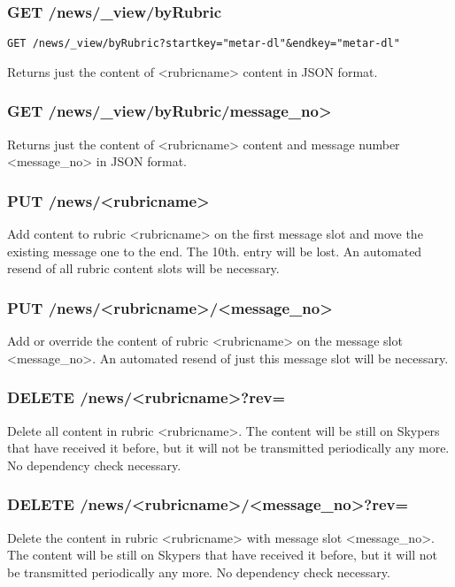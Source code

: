 \subsubsection{GET /news/\_view/byRubric}
\begin{verbatim}
GET /news/_view/byRubric?startkey="metar-dl"&endkey="metar-dl"
\end{verbatim}

Returns just the content of <rubricname> content in JSON format.

\subsubsection{GET /news/\_view/byRubric/message\_no>}
Returns just the content of <rubricname> content and message number <message\_no> in JSON format.

\subsubsection{PUT /news/<rubricname>}
Add content to rubric <rubricname> on the first message slot and move the existing message one to the end. The 10th. entry will be lost. An automated resend of all rubric content slots will be necessary.

\subsubsection{PUT /news/<rubricname>/<message\_no>}
Add or override the content of rubric <rubricname> on the message slot <message\_no>. An automated resend of just this message slot will be necessary.

\subsubsection{DELETE /news/<rubricname>?rev=}
Delete all content in rubric <rubricname>. The content will be still on Skypers that have received it before, but it will not be transmitted periodically any more. No dependency check necessary.

\subsubsection{DELETE /news/<rubricname>/<message\_no>?rev=}
Delete the content in rubric <rubricname> with message slot <message\_no>. The content will be still on Skypers that have received it before, but it will not be transmitted periodically any more. No dependency check necessary.

